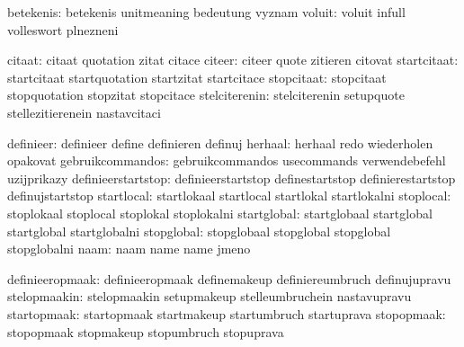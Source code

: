                     betekenis:  betekenis                    unitmeaning
                                bedeutung                    vyznam
                       voluit:  voluit                       infull
                                volleswort                   plnezneni

                       citaat:  citaat                       quotation
                                zitat                        citace
                       citeer:  citeer                       quote
                                zitieren                     citovat
                  startcitaat:  startcitaat                  startquotation
                                startzitat                   startcitace
                   stopcitaat:  stopcitaat                   stopquotation
                                stopzitat                    stopcitace
                stelciterenin:  stelciterenin                setupquote
                                stellezitierenein            nastavcitaci

                    definieer:  definieer                    define
                                definieren                   definuj
                      herhaal:  herhaal                      redo
                                wiederholen                  opakovat
             gebruikcommandos:  gebruikcommandos             usecommands
                                verwendebefehl               uzijprikazy
           definieerstartstop:  definieerstartstop           definestartstop
                                definierestartstop           definujstartstop
                   startlocal:  startlokaal                  startlocal
                                startlokal                   startlokalni
                    stoplocal:  stoplokaal                   stoplocal
                                stoplokal                    stoplokalni
                  startglobal:  startglobaal                 startglobal
                                startglobal                  startglobalni
                   stopglobal:  stopglobaal                  stopglobal
                                stopglobal                   stopglobalni
                         naam:  naam                         name
                                name                         jmeno

              definieeropmaak:  definieeropmaak              definemakeup
                                definiereumbruch             definujupravu
                 stelopmaakin:  stelopmaakin                 setupmakeup
                                stelleumbruchein             nastavupravu
                  startopmaak:  startopmaak                  startmakeup
                                startumbruch                 startuprava
                   stopopmaak:  stopopmaak                   stopmakeup
                                stopumbruch                  stopuprava

